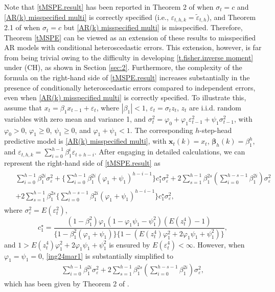 \documentclass[ejsv2]{imsart}
\theoremstyle{plain}
\theoremstyle{definition}
\theoremstyle{remark}
\begin{document}
Note that \eqref{tMSPE.result}
has been reported in Theorem 2 of \cite{Ing2003a}
when $\sigma_t= c$ and
\eqref{AR(k) misspecified multi} is correctly specified
(i.e., $\varepsilon_{t,h,k} = \tilde{\varepsilon}_{t, h}$),
and Theorem 2.1 of \cite{Hsu2019} when
$\sigma_t=c$ but \eqref{AR(k) misspecified multi} is misspecified.
Therefore, Theorem \ref{tMSPE} can be viewed as an extension of these results
to misspecified AR models with conditional heteroscedastic errors.
This extension, however,
is far from being trivial
owing to the difficulty in developing
\eqref{t.fisher.inverse moment} under (CH), as shown in Section \ref{sec:2}.
Furthermore, the complexity of the formula on the right-hand side of \eqref{tMSPE.result} increases 
substantially in the presence of conditionally heteroscedastic errors compared to independent errors, even when 
\eqref{AR(k) misspecified multi} is correctly specified.
To illustrate this, assume that
$x_t=\beta_1 x_{t-1}+\varepsilon_{t}$, where
$|\beta_1|<1$, $\varepsilon_{t}=\sigma_t z_t$,
$z_t$ are i.i.d. random variables with zero mean and variance 1, and
$\sigma_t^2=\varphi_0+\varphi_1
\varepsilon_{t-1}^2+
\psi_1 \sigma_{t-1}^2$,
with $\varphi_0>0$, $\varphi_1\geq0$, $\psi_1\geq0$,
and $\varphi_1+\psi_1<1$.
The corresponding $h$-step-head
predictive model is
\eqref{AR(k) misspecified multi},
with $\mathbf{x}_{t}(k)=x_t$,
$\bm{\beta}_h(k)= \beta_1^{h}$, and
$\varepsilon_{t,h,k}=\sum_{i=0}^{h-1}\beta_1^{i}
\varepsilon_{t+h-i}$.
After engaging in detailed calculations,
we can represent the right-hand side of \eqref{tMSPE.result} as
\begin{align}
\label{ing24mar1}
\begin{split}
 &  \sum_{i=0}^{h-1}\beta_1^{2i}\sigma_\varepsilon^2+\{\sum_{i=0}^{h-1}\beta_1^{2i}(\varphi_1+\psi_1)^{h-i-1}\}c_1^\star\sigma_\varepsilon^2+2\sum_{s=1}^{h-1}\beta_1^{2s}(\sum_{i=0}^{h-s-1}\beta_1^{2i})\sigma_\varepsilon^2\\
&+2\sum_{s=1}^{h-1}\beta_1^{2s}\{\sum_{i=0}^{h-s-1}\beta_1^{2i}(\varphi_1+\psi_1)^{h-i-1}\}c_1^\star\sigma_\varepsilon^2,
\end{split}
\end{align}
where $\sigma_\varepsilon^2=E(\varepsilon_t^2)$,
$$c_1^\star=\frac{(1-\beta_1^2)\varphi_1(1-\varphi_1\psi_1-\psi_1^2)(E(z_t^4)-1)}{\{1-\beta_1^2(\varphi_1+\psi_1)\}
\{1-(E(z_t^4)\varphi_1^2+2\varphi_1\psi_1+\psi_1^2)\}},$$
and
$1>E(z_t^4)\varphi_1^2+2\varphi_1\psi_1+\psi_1^2$
is ensured by $E(\varepsilon_t^4)<\infty$.
However, when $\varphi_1=\psi_1=0$,
\eqref{ing24mar1} is substantially simplified 
to 
\begin{eqnarray*}
\sum_{i=0}^{h-1}
\beta_1^{2i}\sigma_\varepsilon^2+2\sum_{s=1}^{h-1}\beta_1^{2s}(\sum_{i=0}^{h-s-1}\beta_1^{2i})\sigma_\varepsilon^2,
\end{eqnarray*}
which has been given by Theorem 2 of \cite{Ing2003a}.
\end{document}
